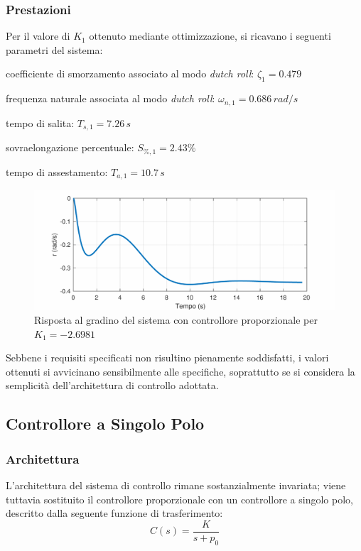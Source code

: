 \subsubsection{Prestazioni}
Per il valore di $K_1$ ottenuto mediante ottimizzazione, si ricavano i seguenti parametri del sistema:
\begin{sitemize}
    \item coefficiente di smorzamento associato al modo \textit{dutch roll}: $\zeta_1 = 0.479$
    \item frequenza naturale associata al modo \textit{dutch roll}: $\omega_{n, 1} = 0.686\, rad/s$
    \item tempo di salita: $T_{s, 1} = 7.26 \, s$
    \item sovraelongazione percentuale: $S_{\%, 1} = 2.43\%$
    \item tempo di assestamento: $T_{a, 1} = 10.7 \, s$
\end{sitemize}

\begin{figure}[H]
    \centering
    \includegraphics[width=0.7\linewidth]{Immagini/proportional_step_lateral.pdf}
    \caption{Risposta al gradino del sistema con controllore proporzionale per $K_1 = -2.6981$}
\end{figure}

Sebbene i requisiti specificati non risultino pienamente soddisfatti, i valori ottenuti si avvicinano sensibilmente alle specifiche, soprattutto se si considera la semplicità dell'architettura di controllo adottata.

\subsection{Controllore a Singolo Polo}

\subsubsection{Architettura}
L'architettura del sistema di controllo rimane sostanzialmente invariata; viene tuttavia sostituito il controllore proporzionale con un controllore a singolo polo, descritto dalla seguente funzione di trasferimento:
\begin{equation*}
    C(s) = \frac{K}{s + p_0}
\end{equation*}

